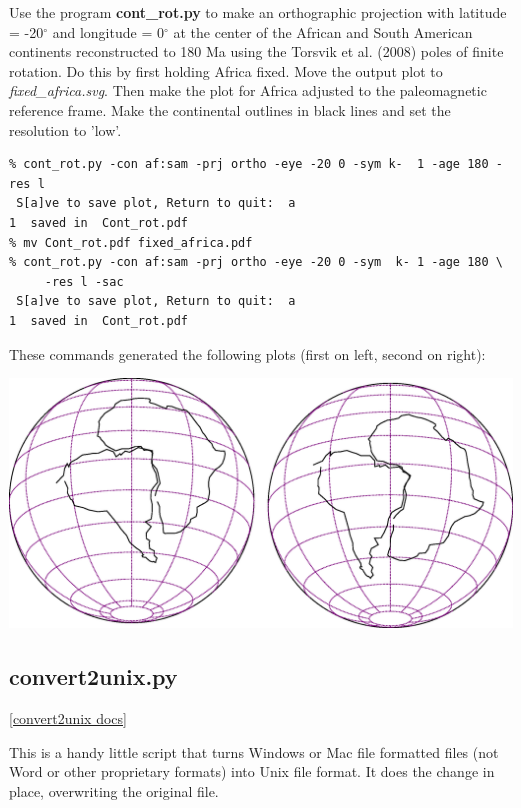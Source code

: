 \documentclass[11pt]{book}
\begin{document}
{{Use the program {\bf cont\_rot.py} to make an orthographic projection with latitude = -20$^{\circ}$ and longitude = 0$^{\circ}$ at the center of the African and South American  continents reconstructed to 180 Ma using the Torsvik et al. (2008) poles of finite rotation.  \nocite{torsvik08} Do this by first holding Africa fixed.  Move the output plot to {\it fixed\_africa.svg}.  Then make the plot for Africa adjusted  to the paleomagnetic reference frame.  Make the continental outlines in black lines and set the resolution to 'low'.

\begin{verbatim}
% cont_rot.py -con af:sam -prj ortho -eye -20 0 -sym k-  1 -age 180 -res l
 S[a]ve to save plot, Return to quit:  a
1  saved in  Cont_rot.pdf
% mv Cont_rot.pdf fixed_africa.pdf
% cont_rot.py -con af:sam -prj ortho -eye -20 0 -sym  k- 1 -age 180 \
     -res l -sac
 S[a]ve to save plot, Return to quit:  a
1  saved in  Cont_rot.pdf
\end{verbatim}

These commands generated the following plots (first on left, second on right):

{%
\hskip 1cm %
\includegraphics[width=15cm]{EPSfiles/controt.eps}}

\subsection{convert2unix.py}
\href{https://github.com/PmagPy/PmagPy/blob/master/programs/convert2unix.py}{[convert2unix docs]}

This is a handy little script that turns Windows or Mac file formatted files (not Word or other proprietary formats) into Unix file format.  It does the change in place, overwriting the original file.

}}
\end{document}
